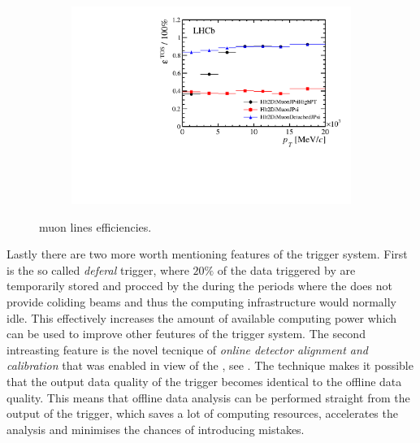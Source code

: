 \begin{figure}[t]
\begin{subfigure}{0.5\textwidth}
    \caption{}
    \label{det_run_one_hlt1_muon_line_eff}
  \end{subfigure}
  \begin{subfigure}{0.5\textwidth}
    \raggedleft
    \includegraphics[width=\textwidth,trim=0.45cm 0cm 0.4cm 0cm, clip=true]{Figures/Chapter2/hlt2_muon_eff}
    \caption{}
    \label{det_run_one_hlt2_muon_line_eff}
  \end{subfigure}
  \caption{\runone muon lines efficiencies.}
  \label{det_run_one_muon_line_eff}
\end{figure}



Lastly there are two more worth mentioning features of the \lhcb trigger system. First is the so called
{\it deferal} trigger, where $20\%$ of the data triggered by \lzero are temporarily stored and procced by the \hltone
during the periods where the \lhc does not provide coliding beams and thus the \lhcb computing infrastructure
would normally idle. This effectively increases the amount of available computing power which can be used
to improve other feutures of the trigger system. The second intreasting feature is the novel tecnique of
{\it online detector alignment and calibration} that was enabled in view of the \runtwo, see \cite{Aaij:2016rxn}.
The technique makes it possible that the output data quality of the trigger becomes identical to the offline data quality.
This means that offline data analysis can be performed straight from the output of the trigger, which saves
a lot of computing resources, accelerates the analysis and minimises the chances of introducing mistakes.
